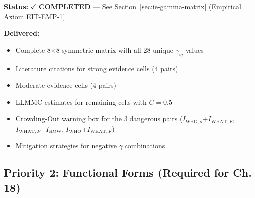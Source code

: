 \begin{tcolorbox}[colback=green!5!white, colframe=green!75!black,
    title=\textbf{TODO-IE-3: Intervention Complementarity Matrix $\gamma_{ij}$ --- COMPLETED}]

\textbf{Status:} $\checkmark$ \textbf{COMPLETED} --- See Section~\ref{sec:ie-gamma-matrix} (Empirical Axiom EIT-EMP-1)

\textbf{Delivered:}
\begin{itemize}[nosep]
    \item Complete 8$\times$8 symmetric matrix with all 28 unique $\gamma_{ij}$ values
    \item Literature citations for strong evidence cells (4 pairs)
    \item Moderate evidence cells (4 pairs)
    \item LLMMC estimates for remaining cells with $C = 0.5$
    \item Crowding-Out warning box for the 3 dangerous pairs ($I_{\text{WHO},o}$+$I_{\text{WHAT},F}$, $I_{\text{WHAT},F}$+$I_{\text{HOW}}$, $I_{\text{WHO}}$+$I_{\text{WHAT},F}$)
    \item Mitigation strategies for negative $\gamma$ combinations
\end{itemize}

\end{tcolorbox}

\subsection{Priority 2: Functional Forms (Required for Ch. 18)}

